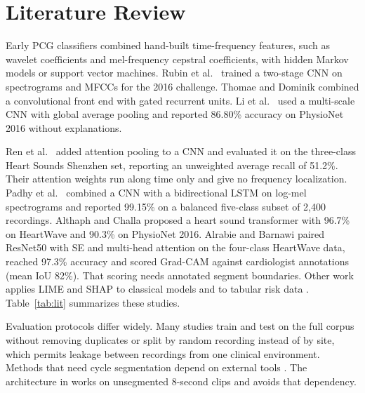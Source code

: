 \documentclass[conference]{IEEEtran}
\begin{document}
\section{Literature Review}
Early PCG classifiers combined hand-built time-frequency features, such as wavelet coefficients and mel-frequency cepstral coefficients, with hidden Markov models or support vector machines. Rubin et al.\ \cite{rubin} trained a two-stage CNN on spectrograms and MFCCs for the 2016 challenge. Thomae and Dominik \cite{thomae} combined a convolutional front end with gated recurrent units. Li et al.\ \cite{li} used a multi-scale CNN with global average pooling and reported 86.80\% accuracy on PhysioNet 2016 without explanations.

Ren et al.\ \cite{ren} added attention pooling to a CNN and evaluated it on the three-class Heart Sounds Shenzhen set, reporting an unweighted average recall of 51.2\%. Their attention weights run along time only and give no frequency localization. Padhy et al.\ \cite{padhy} combined a CNN with a bidirectional LSTM on log-mel spectrograms and reported 99.15\% on a balanced five-class subset of 2,400 recordings. Althaph and Challa \cite{althaph} proposed a heart sound transformer with 96.7\% on HeartWave and 90.3\% on PhysioNet 2016. Alrabie and Barnawi \cite{alrabie} paired ResNet50 with SE and multi-head attention on the four-class HeartWave data, reached 97.3\% accuracy and scored Grad-CAM against cardiologist annotations (mean IoU 82\%). That scoring needs annotated segment boundaries. Other work applies LIME and SHAP to classical models \cite{ramakrishna} and to tabular risk data \cite{guleria}. Table~\ref{tab:lit} summarizes these studies.

Evaluation protocols differ widely. Many studies train and test on the full corpus without removing duplicates or split by random recording instead of by site, which permits leakage between recordings from one clinical environment. Methods that need cycle segmentation depend on external tools \cite{springer}. The architecture in \cite{alrabie} works on unsegmented 8-second clips and avoids that dependency.
\end{document}
